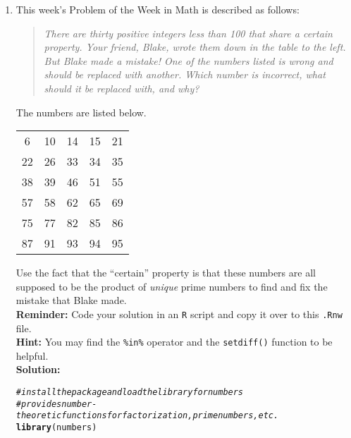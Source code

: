 \documentclass{article}\usepackage[]{graphicx}\usepackage[]{xcolor}
\makeatletter
\newcommand{\hlcom}[1]{\textcolor[rgb]{0.678,0.584,0.686}{\textit{#1}}}%
\newcommand{\hldef}[1]{\textcolor[rgb]{0.345,0.345,0.345}{#1}}%
\newcommand{\hlkwd}[1]{\textcolor[rgb]{0.737,0.353,0.396}{\textbf{#1}}}%
\newenvironment{kframe}{%
 \def\at@end@of@kframe{}%
 \ifinner\ifhmode%
  \def\at@end@of@kframe{\end{minipage}}%
  \begin{minipage}{\columnwidth}%
 \fi\fi%
 \def\FrameCommand##1{\hskip\@totalleftmargin \hskip-\fboxsep
 \colorbox{shadecolor}{##1}\hskip-\fboxsep
     \hskip-\linewidth \hskip-\@totalleftmargin \hskip\columnwidth}%
 \MakeFramed {\advance\hsize-\width
   \@totalleftmargin\z@ \linewidth\hsize
   \@setminipage}}%
 {\par\unskip\endMakeFramed%
 \at@end@of@kframe}
\newenvironment{knitrout}{}{} %
\makeatother
\begin{document}
\begin{enumerate}
\item This week's Problem of the Week in Math is described as follows:
\begin{quotation}
  \textit{There are thirty positive integers less than 100 that share a certain 
  property. Your friend, Blake, wrote them down in the table to the left. But 
  Blake made a mistake! One of the numbers listed is wrong and should be replaced 
  with another. Which number is incorrect, what should it be replaced with, and 
  why?}
\end{quotation}
The numbers are listed below.
\begin{center}
  \begin{tabular}{ccccc}
    6 & 10 & 14 & 15 & 21\\
    22 & 26 & 33 & 34 & 35\\
    38 & 39 & 46 & 51 & 55\\
    57 & 58 & 62 & 65 & 69\\
    75 & 77 & 82 & 85 & 86\\
    87 & 91 & 93 & 94 & 95
  \end{tabular}
\end{center}
Use the fact that the ``certain'' property is that these numbers are all supposed
to be the product of \emph{unique} prime numbers to find and fix the mistake that
Blake made.\\
\textbf{Reminder:} Code your solution in an \texttt{R} script and copy it over
to this \texttt{.Rnw} file.\\
\textbf{Hint:} You may find the \verb|%in%| operator and the \verb|setdiff()| function to be helpful.\\

\textbf{Solution:} 

\begin{knitrout}\scriptsize
{}\color{fgcolor}\begin{kframe}
\begin{alltt}
\hlcom{# install the package and load the library for numbers}
\hlcom{# provides number-theoretic functions for factorization, prime numbers, etc.}
\hlkwd{library}\hldef{(numbers)}


\end{alltt}
\end{kframe}
\end{knitrout}
\end{enumerate}
\end{document}
